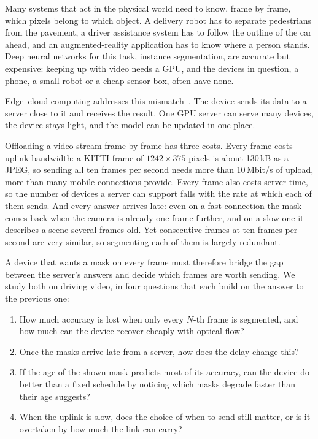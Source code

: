 \documentclass[conference]{IEEEtran}
\begin{document}
Many systems that act in the physical world need to know, frame by frame, which pixels belong to which object. A delivery robot has to separate pedestrians from the pavement, a driver assistance system has to follow the outline of the car ahead, and an augmented-reality application has to know where a person stands. Deep neural networks for this task, instance segmentation, are accurate but expensive: keeping up with video needs a GPU, and the devices in question, a phone, a small robot or a cheap sensor box, often have none.

Edge--cloud computing addresses this mismatch~\cite{shi2016edge, satyanarayanan2017edge}. The device sends its data to a server close to it and receives the result. One GPU server can serve many devices, the device stays light, and the model can be updated in one place.

Offloading a video stream frame by frame has three costs. Every frame costs uplink bandwidth: a KITTI frame of $1242\times375$ pixels is about 130\,kB as a JPEG, so sending all ten frames per second needs more than 10\,Mbit/s of upload, more than many mobile connections provide. Every frame also costs server time, so the number of devices a server can support falls with the rate at which each of them sends. And every answer arrives late: even on a fast connection the mask comes back when the camera is already one frame further, and on a slow one it describes a scene several frames old. Yet consecutive frames at ten frames per second are very similar, so segmenting each of them is largely redundant.

A device that wants a mask on every frame must therefore bridge the gap between the server's answers and decide which frames are worth sending. We study both on driving video, in four questions that each build on the answer to the previous one:
\begin{enumerate}
\item How much accuracy is lost when only every $N$-th frame is segmented, and how much can the device recover cheaply with optical flow?
\item Once the masks arrive late from a server, how does the delay change this?
\item If the age of the shown mask predicts most of its accuracy, can the device do better than a fixed schedule by noticing which masks degrade faster than their age suggests?
\item When the uplink is slow, does the choice of when to send still matter, or is it overtaken by how much the link can carry?
\end{enumerate}
\end{document}
